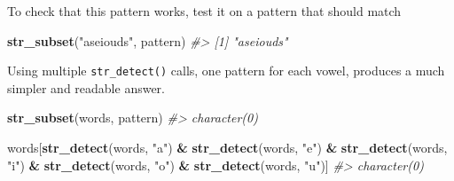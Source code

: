 \documentclass[]{book}
\newenvironment{Shaded}{\begin{snugshade}}{\end{snugshade}}
\newcommand{\CommentTok}[1]{\textcolor[rgb]{0.56,0.35,0.01}{\textit{#1}}}
\newcommand{\ControlFlowTok}[1]{\textcolor[rgb]{0.13,0.29,0.53}{\textbf{#1}}}
\newcommand{\DataTypeTok}[1]{\textcolor[rgb]{0.13,0.29,0.53}{#1}}
\newcommand{\DecValTok}[1]{\textcolor[rgb]{0.00,0.00,0.81}{#1}}
\newcommand{\KeywordTok}[1]{\textcolor[rgb]{0.13,0.29,0.53}{\textbf{#1}}}
\newcommand{\NormalTok}[1]{#1}
\newcommand{\OperatorTok}[1]{\textcolor[rgb]{0.81,0.36,0.00}{\textbf{#1}}}
\newcommand{\StringTok}[1]{\textcolor[rgb]{0.31,0.60,0.02}{#1}}
\theoremstyle{plain}
\theoremstyle{remark}
\theoremstyle{definition}
\theoremstyle{definition}
\theoremstyle{definition}
\theoremstyle{remark}
\begin{document}
\begin{enumerate}
\begin{Shaded}
\end{Shaded}

  To check that this pattern works, test it on a pattern that should
  match

\begin{Shaded}
\begin{Highlighting}[]
\KeywordTok{str_subset}\NormalTok{(}\StringTok{"aseiouds"}\NormalTok{, pattern)}
\CommentTok{#> [1] "aseiouds"}
\end{Highlighting}
\end{Shaded}

  Using multiple \texttt{str\_detect()} calls, one pattern for each
  vowel, produces a much simpler and readable answer.

\begin{Shaded}
\begin{Highlighting}[]
\KeywordTok{str_subset}\NormalTok{(words, pattern)}
\CommentTok{#> character(0)}

\NormalTok{words[}\KeywordTok{str_detect}\NormalTok{(words, }\StringTok{"a"}\NormalTok{) }\OperatorTok{&}
\StringTok{      }\KeywordTok{str_detect}\NormalTok{(words, }\StringTok{"e"}\NormalTok{) }\OperatorTok{&}
\StringTok{      }\KeywordTok{str_detect}\NormalTok{(words, }\StringTok{"i"}\NormalTok{) }\OperatorTok{&}
\StringTok{      }\KeywordTok{str_detect}\NormalTok{(words, }\StringTok{"o"}\NormalTok{) }\OperatorTok{&}
\StringTok{      }\KeywordTok{str_detect}\NormalTok{(words, }\StringTok{"u"}\NormalTok{)]}
\CommentTok{#> character(0)}
\end{Highlighting}
\end{Shaded}


\end{enumerate}
\end{document}
